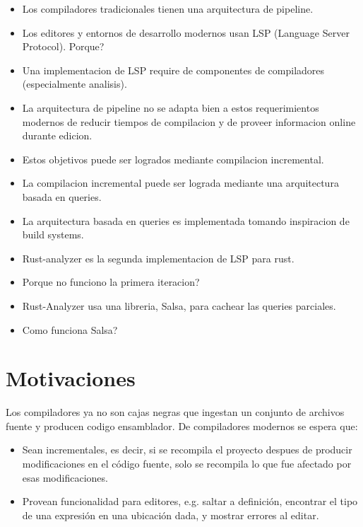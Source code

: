 \begin{itemize}[noitemsep]

\item Los compiladores tradicionales tienen una arquitectura de pipeline.

\item Los editores y entornos de desarrollo modernos usan LSP (Language Server
Protocol). Porque?

\item Una implementacion de LSP require de componentes de compiladores
(especialmente analisis).

\item La arquitectura de pipeline no se adapta bien a estos requerimientos
modernos de reducir tiempos de compilacion y de proveer informacion online
durante edicion.

\item Estos objetivos puede ser logrados mediante compilacion incremental.

\item La compilacion incremental puede ser lograda mediante una arquitectura
basada en queries.

\item La arquitectura basada en queries es implementada tomando inspiracion de
build systems.

\item Rust-analyzer es la segunda implementacion de LSP para rust.

\item Porque no funciono la primera iteracion?

\item Rust-Analyzer usa una libreria, Salsa, para cachear las queries parciales.

\item Como funciona Salsa?

\end{itemize}

\chapter*{Motivaciones}

Los compiladores ya no son cajas negras que ingestan un conjunto de archivos
fuente y producen codigo ensamblador. De compiladores modernos se espera que:

\begin{itemize}[noitemsep]

\item Sean incrementales, es decir, si se recompila el proyecto despues de
producir modificaciones en el código fuente, solo se recompila lo que fue
afectado por esas modificaciones.

\item Provean funcionalidad para editores, e.g. saltar a definición, encontrar
el tipo de una expresión en una ubicación dada, y mostrar errores al editar.

\end{itemize}

